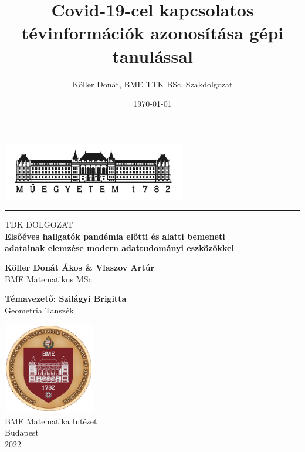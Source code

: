 \documentclass[12pt]{article}
\title{Covid-19-cel kapcsolatos tévinformációk azonosítása gépi tanulással}
\author{Köller Donát, BME TTK BSc. Szakdolgozat}
\date{\today}
\begin{document}
\begin{titlepage}
\begin{center}
       \includegraphics[width=0.6\textwidth]{kepek/bme_logo_kicsi}
       \rule{15cm}{0.1mm}
       
       \vspace*{0.5cm}
       
       
       
       \huge{TDK DOLGOZAT} \\
       
       

       \vspace{1cm}
        \Large{\textbf{Elsőéves hallgatók pandémia előtti és alatti bemeneti}} \\
        \Large{\textbf{adatainak elemzése modern adattudományi eszközökkel}} 
        
        \vspace{1.8cm}
        
        \large{\textbf{Köller Donát Ákos \& Vlaszov Artúr}}\\
       \large{BME Matematikus MSc} \\
       
       
       \vspace{1.8cm}
               

      \large{\textbf{Témavezető: Szilágyi Brigitta}}\\
      \large{Geometria Tanszék}
            
       
            
       \vfill
     
       \includegraphics[width=0.3\textwidth]{kepek/bme_cimer}\\
       \large{BME Matematika Intézet} \\
       \large{Budapest} \\
       \large{2022}
            

            
   \end{center}
\end{titlepage}
\newpage
\end{document}
